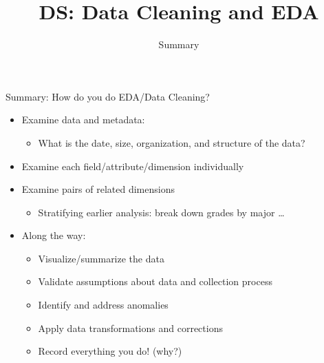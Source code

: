 \documentclass[aspectratio=169]{../latex_main/tntbeamer}  %
\title[Introduction]{DS: Data Cleaning and EDA}
\subtitle{Summary}
\begin{document}
	
	\maketitle
	
	\begin{frame}{Summary: How do you do EDA/Data Cleaning?}
	    \begin{itemize}
	        \item Examine data and metadata: 
	        \begin{itemize}
	            \item What is the date, size, organization, and structure of the data?
	        \end{itemize}
	        \item Examine each field/attribute/dimension individually
	        \item Examine pairs of related dimensions
	        \begin{itemize}
	            \item Stratifying earlier analysis: break down grades by major … 
	        \end{itemize}
	        \item Along the way:
	        \begin{itemize}
	            \item Visualize/summarize the data 
	            \item Validate assumptions about data and collection process
	            \item Identify and address anomalies 
	            \item Apply data transformations and corrections
	            \item Record everything you do! (why?)
	        \end{itemize}
	    \end{itemize}
	\end{frame}
\end{document}
